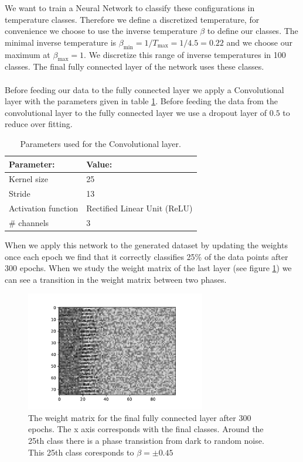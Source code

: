 \documentclass[10 pt, a4paper]{article}
\begin{document}
We want to train a Neural Network to classify these configurations in temperature classes. Therefore we define a discretized temperature, for convenience we choose to use the inverse temperature $\beta$ to define our classes. The minimal inverse temperature is $\beta_\mathrm{min} = 1/T_\mathrm{max} = 1/4.5 = 0.22$ and we choose our maximum at $\beta_\mathrm{max} = 1$. We discretize this range of inverse temperatures in 100 classes. The final fully connected layer of the network uses these classes.
\\
\\
Before feeding our data to the fully connected layer we apply a Convolutional layer with the parameters given in table \ref{tab:CNNparam}. Before feeding the data from the convolutional layer to the fully connected layer we use a dropout layer of $0.5$ to reduce over fitting.

\begin{table}[H]
\centering
\caption{Parameters used for the Convolutional layer. \label{tab:CNNparam}}
\begin{tabular}{l|l}
Parameter: & Value:                                           \\ \hline
Kernel size & 25                     \\
Stride & 13  \\
Activation function        & Rectified Linear Unit (ReLU) \\                           
\# channels        & 3                           \\
\end{tabular}
\end{table} 


When we apply this network to the generated dataset by updating the weights once each epoch we find that it correctly classifies 25\% of the data points after 300 epochs. When we study the weight matrix of the last layer (see figure \ref{fig:weights}) we can see a transition in the weight matrix between two phases. 

\begin{figure}[H] 
\centering
\includegraphics[width=0.7\textwidth]{weights}
\caption{The weight matrix for the final fully connected layer after 300 epochs. The x axis corresponds with the final classes. Around the 25th class there is a phase transistion from dark to random noise. This 25th class coresponds to $\beta = \pm 0.45$ \label{fig:weights}}
\end{figure}
\end{document}
